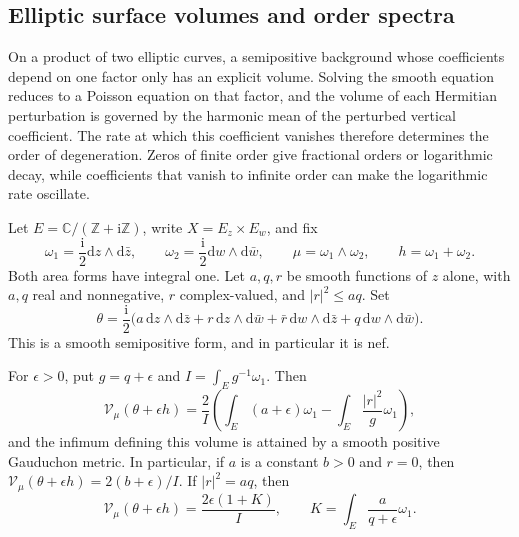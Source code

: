 \subsection{Elliptic surface volumes and order spectra}\label{sec:nef-surface-orders}

On a product of two elliptic curves, a semipositive background whose coefficients depend on one factor only has an explicit volume. Solving the smooth equation reduces to a Poisson equation on that factor, and the volume of each Hermitian perturbation is governed by the harmonic mean of the perturbed vertical coefficient. The rate at which this coefficient vanishes therefore determines the order of degeneration. Zeros of finite order give fractional orders or logarithmic decay, while coefficients that vanish to infinite order can make the logarithmic rate oscillate.

Let $E=\mathbb C/(\mathbb Z+\mathrm{i}\mathbb Z)$, write $X=E_z\times E_w$, and fix
\[
 \omega_1=\frac{\mathrm{i}}{2}\mathrm{d} z\wedge\mathrm{d}\bar z,\qquad
 \omega_2=\frac{\mathrm{i}}{2}\mathrm{d} w\wedge\mathrm{d}\bar w,\qquad
 \mu=\omega_1\wedge\omega_2,\qquad h=\omega_1+\omega_2.
\]
Both area forms have integral one. Let $a,q,r$ be smooth functions of $z$ alone, with $a,q$ real and nonnegative, $r$ complex-valued, and $|r|^2\leq aq$. Set
\[
 \theta=\frac{\mathrm{i}}{2}\bigl(a\,\mathrm{d} z\wedge\mathrm{d}\bar z+
 r\,\mathrm{d} z\wedge\mathrm{d}\bar w+\bar r\,\mathrm{d} w\wedge\mathrm{d}\bar z+
 q\,\mathrm{d} w\wedge\mathrm{d}\bar w\bigr).
\]
This is a smooth semipositive form, and in particular it is nef.

\begin{proposition}\label{prop:nef-elliptic-exact-volume}
For $\epsilon>0$, put $g=q+\epsilon$ and $I=\int_Eg^{-1}\omega_1$. Then
\begin{equation}\label{eq:nef-elliptic-volume}
 \mathcal V_\mu(\theta+\epsilon h)
 =\frac{2}{I}\left(\int_E(a+\epsilon)\omega_1-
 \int_E\frac{|r|^2}{g}\omega_1\right),
\end{equation}
and the infimum defining this volume is attained by a smooth positive Gauduchon metric. In particular, if $a$ is a constant $b>0$ and $r=0$, then $\mathcal V_\mu(\theta+\epsilon h)=2(b+\epsilon)/I$. If $|r|^2=aq$, then
\begin{equation}\label{eq:nef-rank-one-elliptic-volume}
 \mathcal V_\mu(\theta+\epsilon h)=\frac{2\epsilon(1+K)}{I},
 \qquad K=\int_E\frac{a}{q+\epsilon}\omega_1.
\end{equation}
\end{proposition}

